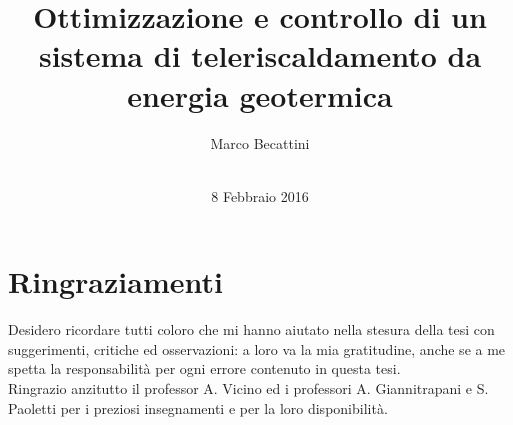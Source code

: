 \documentclass[laurea,oneside,11pt]{USiena_tesiLM3}
\title{Ottimizzazione e controllo di un sistema di teleriscaldamento da energia geotermica}
\author{Marco Becattini\\~\\}
\date{8 Febbraio 2016}
\newcommand{\facciatabianca}{\newpage\shipout\null\stepcounter{page}}
\begin{document}
\maketitle

\facciatabianca


%
%
  

\frontmatter
\chapter*{Ringraziamenti}

Desidero ricordare tutti coloro che mi hanno aiutato nella stesura della tesi con suggerimenti, critiche ed osservazioni: a loro va la mia gratitudine, anche se a me spetta la responsabilità per ogni errore contenuto in questa tesi.\\

Ringrazio anzitutto il  professor A. Vicino ed i professori A. Giannitrapani e S. Paoletti per i preziosi insegnamenti e per la loro disponibilità. \\
\end{document}
